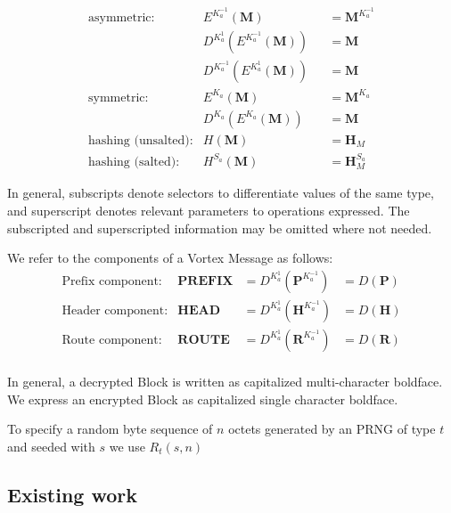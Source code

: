 \documentclass[10pt,journal,compsoc]{IEEEtran}
\begin{document}
\begin{align*}
\text{asymmetric:}         & E^{K^{-1}_a}\left(\mathbf{M}\right)                            && =\mathbf{M}^{K^{-1}_a}\\
& D^{K^{1}_a}\left(E^{K^{-1}_a}\left(\mathbf{M}\right)\right)    && =\mathbf{M}\\
& D^{K^{-1}_a}\left(E^{K^{1}_a}\left(\mathbf{M}\right)\right)    && =\mathbf{M}\\
\text{symmetric:}          & E^{K_a}\left(\mathbf{M}\right)                                 && =\mathbf{M}^{K_a}\\
& D^{K_a}\left(E^{K_a}\left(\mathbf{M}\right)\right)          && =\mathbf{M}\\
\text{hashing (unsalted):}& H\left(\mathbf{M}\right)                                       && =\mathbf{H}_M\\
\text{hashing (salted):}  & H^{S_a}\left(\mathbf{M}\right)                                 && =\mathbf{H}^{S_a}_M
\end{align*}

In general, subscripts denote selectors to differentiate values of the same type, and superscript denotes relevant parameters to operations expressed. The subscripted and superscripted information may be omitted where not needed.

We refer to the components of a Vortex Message as follows:
\begin{align*}
\text{Prefix component:}         & \mathbf{PREFIX}                 &=D^{K^{1}_a}\left(\mathbf{P}^{K^{-1}_a}\right) &=D\left(\mathbf{P}\right)\\
\text{Header component:}         & \mathbf{HEAD}                 &=D^{K^{1}_a}\left(\mathbf{H}^{K^{-1}_a}\right) &=D\left(\mathbf{H}\right)\\
\text{Route component:}         & \mathbf{ROUTE}                 &=D^{K^{1}_a}\left(\mathbf{R}^{K^{-1}_a}\right) &=D\left(\mathbf{R}\right)\\
\end{align*}

In general, a decrypted Block is written as capitalized multi-character boldface.  We express an encrypted Block as capitalized single character boldface.

To specify a random byte sequence of $n$ octets generated by an PRNG of type $t$ and seeded with $s$ we use $R_t\left(s,n\right)$

\subsection{Existing work}
\end{document}
